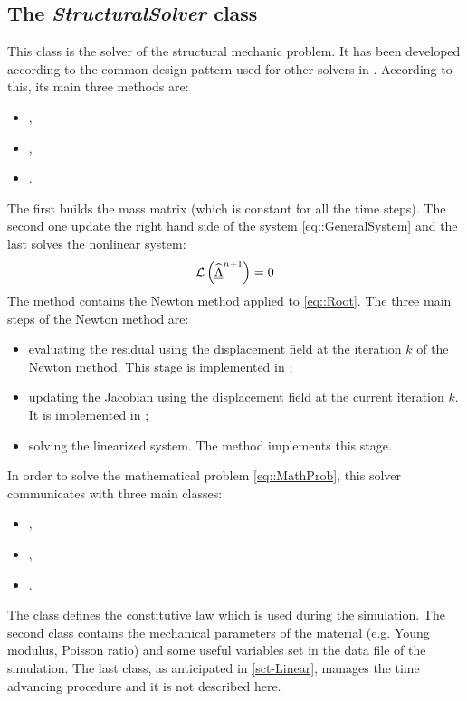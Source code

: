 \subsection{The \textit{StructuralSolver} class} This class is the
solver of the structural mechanic problem. It has been developed
according to the common design pattern used for other solvers in
\LV. According to this, its main three methods are:
\begin{itemize}
  \item {},
  \item {},
  \item {}.
\end{itemize} The first builds the mass matrix \mass (which is
constant for all the time steps). The second one update the right hand
side of the system \eqref{eq::GeneralSystem} and the last solves the
nonlinear system:
\begin{equation} \mathcal{L}\left(\widehat{\underline{\Lambda}}^{n+1}\right)=0
  \label{eq::Root}
\end{equation} The  method contains the Newton method
applied to \eqref{eq::Root}. The three main steps of the Newton method
are:
\begin{itemize}
  \item evaluating the residual using the displacement field at the
iteration $k$ of the Newton method. This stage is implemented in
;
  \item updating the Jacobian using the displacement field at the
current iteration $k$. It is implemented in
;
  \item solving the linearized system. The method
 implements this stage.
\end{itemize} In order to solve the mathematical problem
\eqref{eq::MathProb}, this solver communicates with three main
classes:
\begin{itemize}
  \item {},
  \item {},
  \item {}.
\end{itemize} The  class defines the
constitutive law which is used during the simulation. The second class
contains the mechanical parameters of the material (e.g. Young
modulus, Poisson ratio) and some useful variables set in the data file
of the simulation. The last class, as anticipated in \ref{sct-Linear},
manages the time advancing procedure and it is not described here.\\

